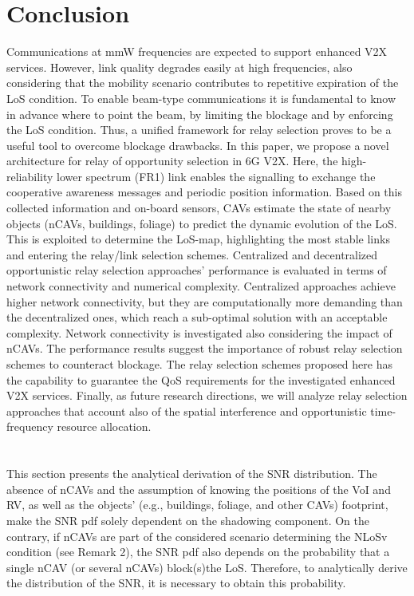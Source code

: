 \documentclass[journal]{IEEEtran}
\begin{document}
\section{Conclusion} \label{sec:conclusions}
Communications at mmW frequencies are expected to support enhanced V2X services. However, link quality degrades easily at high frequencies, also considering that the mobility scenario contributes to repetitive expiration of the LoS condition. To enable beam-type communications it is fundamental to know in advance where to point the beam, by limiting the blockage and by enforcing the LoS condition.
Thus, a unified framework for relay selection proves to be a useful tool to overcome blockage drawbacks. In this paper, we propose a novel architecture for relay of opportunity selection in 6G V2X. Here, the high-reliability lower spectrum (FR1) link enables the signalling to exchange the cooperative awareness messages and periodic position information. Based on this collected information and on-board sensors, CAVs estimate the state of nearby objects (nCAVs, buildings, foliage) to predict the dynamic evolution of the LoS. This is exploited to determine the LoS-map, highlighting the most stable links and entering the relay/link selection schemes. 
Centralized and decentralized opportunistic relay selection approaches' performance is evaluated in terms of network connectivity and numerical complexity. Centralized approaches achieve higher network connectivity, but they are computationally more demanding than the decentralized ones, which reach a sub-optimal solution with an acceptable complexity. Network connectivity is investigated also considering the impact of nCAVs. The performance results suggest the importance of robust relay selection schemes to counteract blockage. The relay selection schemes proposed here has the capability to guarantee the QoS requirements for the investigated enhanced V2X services. Finally, as future research directions, we will analyze relay selection approaches that account also of the spatial interference and opportunistic time-frequency resource allocation.

\appendices

\section{}
This section presents the analytical derivation of the SNR distribution. %
The absence of nCAVs and the assumption of knowing the positions of the VoI and RV, as well as the objects' (e.g., buildings, foliage, and other CAVs) footprint, make the SNR pdf solely dependent on the shadowing component. 
On the contrary, if nCAVs are part of the considered scenario determining the NLoSv condition (see Remark 2), the SNR pdf also depends on the probability that a single nCAV (or several nCAVs) block(s)the LoS. Therefore, to analytically derive the distribution of the SNR, it is necessary to obtain this probability.
\end{document}
